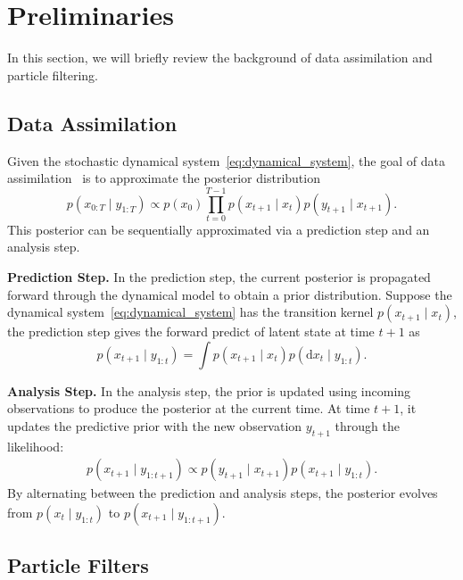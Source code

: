 \documentclass{article}
\newcommand{\dif}{{\mathrm{d}}}
\theoremstyle{plain}
\theoremstyle{definition}
\theoremstyle{remark}
\begin{document}
\vspace{-0.2in}
\section{Preliminaries}

In this section, we will briefly review the background of data assimilation and particle filtering.
\vspace{-0.1in}
\subsection{Data Assimilation}

Given the stochastic dynamical system~\eqref{eq:dynamical_system}, the goal of data assimilation~\cite{sanz2023inverse} is to approximate the posterior distribution
\[
p(x_{0:T} \mid y_{1:T}) \propto 
p(x_0)\prod_{t=0}^{T-1}
p(x_{t+1}\mid x_t)
p(y_{t+1}\mid x_{t+1}).
\]
This posterior can be sequentially approximated via a prediction step and an analysis step. 

\textbf{Prediction Step.} In the prediction step, the current posterior is propagated forward through the dynamical model to obtain a prior distribution. Suppose the dynamical system~\eqref{eq:dynamical_system} has the transition kernel \(p(x_{t+1}\mid x_t)\), the prediction step gives the forward predict of latent state at time $t+1$ as
\begin{equation}
    p(x_{t+1} \mid y_{1:t}) = \int p(x_{t+1} \mid x_{t})  p(\dif x_{t} \mid y_{1:t}).
\label{eq:prediction_step}
\end{equation}

\vspace{-0.1in}
\textbf{Analysis Step.} In the analysis step, the prior is updated using incoming observations to produce the posterior at the current time. At time $t+1$, it updates the predictive prior with the new observation \(y_{t+1}\) through the likelihood:
\begin{equation*}
    \begin{aligned}
        p(x_{t+1} \mid y_{1:t+1}) \propto p(y_{t+1}\mid x_{t+1})  p(x_{t+1} \mid y_{1:t}).
    \end{aligned}
\end{equation*}
By alternating between the prediction and analysis steps, the posterior evolves from
\( p(x_t \mid y_{1:t}) \) to \( p(x_{t+1} \mid y_{1:t+1}) \).
\vspace{-0.1in}
\subsection{Particle Filters}
\label{sec:particle_filter}
\end{document}

